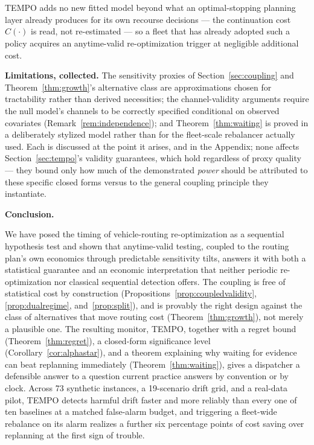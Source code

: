 \documentclass[trsc,dblanonrev]{informs4}
\begin{document}
TEMPO adds no new fitted model beyond what an optimal-stopping
planning layer already produces for its own recourse decisions ---
the continuation cost $\widehat C(\cdot)$ is read, not re-estimated ---
so a fleet that has already adopted such a policy acquires an
anytime-valid re-optimization trigger at negligible additional cost.

\textbf{Limitations, collected.} The sensitivity proxies of
Section~\ref{sec:coupling} and Theorem~\ref{thm:growth}'s alternative
class are approximations chosen for tractability rather than derived
necessities; the channel-validity arguments require the null model's
channels to be correctly specified conditional on observed covariates
(Remark~\ref{rem:independence}); and Theorem~\ref{thm:waiting} is
proved in a deliberately stylized model rather than for the
fleet-scale rebalancer actually used. Each is discussed at the point it
arises, and in the Appendix; none affects Section~\ref{sec:tempo}'s
validity guarantees, which hold regardless of proxy quality --- they
bound only how much of the demonstrated \emph{power} should be
attributed to these specific closed forms versus to the general
coupling principle they instantiate.

\textbf{Conclusion.}\label{sec:conclusion}

We have posed the timing of vehicle-routing re-optimization as a
sequential hypothesis test and shown that anytime-valid testing,
coupled to the routing plan's own economics through predictable
sensitivity tilts, answers it with both a statistical guarantee and an
economic interpretation that neither periodic re-optimization nor
classical sequential detection offers. The coupling is free of
statistical cost by construction
(Propositions~\ref{prop:coupledvalidity}, \ref{prop:dualregime},
and~\ref{prop:split}), and is provably the right design against the
class of alternatives that move routing cost
(Theorem~\ref{thm:growth}), not merely a plausible one. The resulting
monitor, TEMPO, together with a regret bound
(Theorem~\ref{thm:regret}), a closed-form significance level
(Corollary~\ref{cor:alphastar}), and a theorem explaining why waiting
for evidence can beat replanning immediately
(Theorem~\ref{thm:waiting}), gives a dispatcher a defensible answer to
a question current practice answers by convention or by clock. Across
73 synthetic instances, a 19-scenario drift grid, and a real-data
pilot, TEMPO detects harmful drift faster and more reliably than every
one of ten baselines at a matched false-alarm budget, and triggering a
fleet-wide rebalance on its alarm realizes a further six percentage
points of cost saving over replanning at the first sign of trouble.
\end{document}
